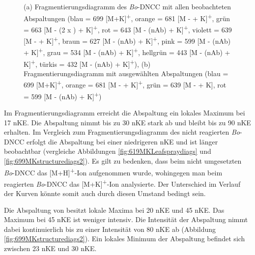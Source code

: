 \begin{figure}[!htbp]
  \caption[Fragmentierungsdiagramme des Reaktionsproduktes von \textit{Bo}-DNCC, Quelle: Autor]{(a) Fragmentierungsdiagramm des \textit{Bo}-DNCC mit allen beobachteten Abspaltungen (blau = 699 [M+K]\textsuperscript{+}, orange = 681 [M -  + K]\textsuperscript{+}, grün = 663 [M - (2 x ) + K]\textsuperscript{+}, rot = 643 [M - (\gls{nAb}) + K]\textsuperscript{+}, violett = 639 [M -  + K]\textsuperscript{+}, braun = 627 [M - (\gls{nAb}) + K]\textsuperscript{+}, pink = 599 [M - (\gls{nAb}) + K]\textsuperscript{+}, grau = 534 [M - (\gls{nAb}) + K]\textsuperscript{+}, hellgrün = 443 [M - (\gls{nAb}) + K]\textsuperscript{+}, türkis = 432 [M - (\gls{nAb}) + K]\textsuperscript{+}), (b) Fragmentierungsdiagramm mit ausgewählten Abspaltungen (blau = 699 [M+K]\textsuperscript{+}, orange = 681 [M -  + K]\textsuperscript{+}, grün = 639 [M -  + K], rot = 599 [M - (\gls{nAb}) + K]\textsuperscript{+})}
\end{figure} 

Im Fragmentierungsdiagramm erreicht die  Abspaltung ein lokales Maximum bei 17 \gls{nKE}. Die Abspaltung nimmt bis zu 30 \gls{nKE} stark ab und bleibt bis zu 90 \gls{nKE} erhalten. Im Vergleich zum Fragmentierungsdiagramm des nicht reagierten \textit{Bo}-DNCC erfolgt die  Abspaltung bei einer niedrigeren \gls{nKE} und ist länger beobachtbar (vergleiche Abbildungen \ref{fig:619MKLeafspraydiags} und \ref{fig:699MKstructurediags2}). Es gilt zu bedenken, dass beim nicht umgesetzten \textit{Bo}-DNCC das [M+H]\textsuperscript{+}-Ion aufgenommen wurde, wohingegen man beim reagierten \textit{Bo}-DNCC das [M+K]\textsuperscript{+}-Ion analysierte. Der Unterschied im Verlauf der Kurven könnte somit auch durch diesen Umstand bedingt sein.

Die Abspaltung von  besitzt lokale Maxima bei 20 \gls{nKE} und 45 \gls{nKE}. Das Maximum bei 45 \gls{nKE} ist weniger intensiv. Die Intensität der Abspaltung nimmt dabei kontinuierlich bis zu einer Intensität von 80 \gls{nKE} ab (Abbildung \ref{fig:699MKstructurediags2}). Ein lokales Minimum der Abspaltung befindet sich zwischen 23 \gls{nKE} und 30 \gls{nKE}. \\



